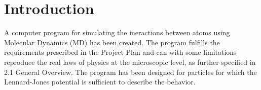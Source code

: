 \section{Introduction}
A computer program for simulating the ineractions between atoms using Molecular Dynamics (MD) has been created. The program fulfills the requirements prescribed in the Project Plan and can with some limitations reproduce the real laws of physics at the microscopic level, as further specified in 2.1 General Overview.
The program has been designed for particles for which the Lennard-Jones potential is sufficient to describe the behavior.
